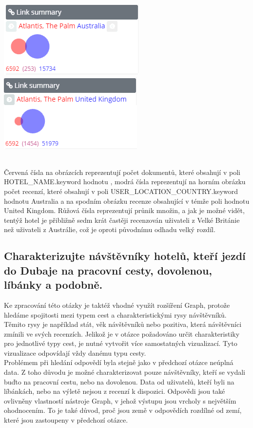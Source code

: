 \documentclass[czech,BP]{thesiskiv}
\begin{document}
\begin{center}
	\includegraphics[scale=0.85]{img/AUS_atlantis.PNG}
	\hspace{0.4cm}
	\includegraphics[scale=0.85]{img/UK_atlantis.PNG}
\end{center}
 \mbox{}\\	
Červená čísla na obrázcích reprezentují počet dokumentů, které obsahují v poli HOTEL\_NAME.keyword hodnotu , modrá čísla reprezentují na horním obrázku počet recenzí, které obsahují v poli USER\_LOCATION\_COUNTRY.keyword hodnotu Australia a na spodním obrázku recenze obsahující v témže poli hodnotu United Kingdom. Růžová čísla reprezentují průnik množin, a jak je možné vidět, tentýž hotel je přibližně sedm krát častěji recenzován uživateli z Velké Británie než uživateli z Austrálie, což je oproti původnímu odhadu velký rozdíl.

\subsection{Charakterizujte návštěvníky hotelů, kteří jezdí do Dubaje na pracovní cesty, dovolenou, líbánky a podobně.}
Ke zpracování této otázky je taktéž vhodné využít rozšíření Graph, protože hledáme spojitosti mezi typem cest a charakteristickými rysy návštěvníků. Těmito rysy je například stát, věk návštěvníků nebo pozitiva, která návštěvníci zmínili ve svých recenzích. Jelikož je v otázce požadováno určit charakteristiky pro jednotlivé typy cest, je nutné vytvořit více samostatných vizualizací. Tyto vizualizace odpovídají vždy danému typu cesty.
\\
Problémem při hledání odpovědí byla stejně jako v předchozí otázce neúplná data. Z toho důvodu je možné charakterizovat pouze návštěvníky, kteří se vydali buďto na pracovní cestu, nebo na dovolenou. Data od uživatelů, kteří byli na líbánkách, nebo na výletě nejsou z recenzí k dispozici. Odpovědi jsou také ovlivněny vlastností nástroje Graph, v jehož výstupu jsou vrcholy s největším ohodnocením. To je také důvod, proč jsou země v odpovědích rozdílné od zemí, které jsou zastoupeny v předchozí otázce.
\end{document}
